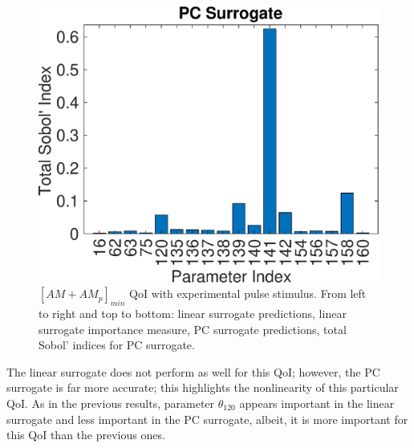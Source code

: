\begin{figure}[h]
\hspace{.1 cm}
\includegraphics[width=.475 \textwidth]{Figures/AM_AMp_Min_QoI_PCE_SI_Experimental.eps}
\caption{$[AM+AM_p]_{min}$ QoI with experimental pulse stimulus. From left to right and top to bottom: linear surrogate predictions, linear surrogate importance measure, PC surrogate predictions, total Sobol' indices for PC surrogate.}
\label{fig:qoi_AM_AMp_Min_exp}
\end{figure}

The linear surrogate does not perform as well for this QoI; however, the PC surrogate is far more accurate; this highlights the nonlinearity of this particular QoI. 
 As in the previous results, parameter $\theta_{120}$ appears important in the linear surrogate and less important in the PC surrogate, albeit, it is more important for this QoI than the previous ones.

